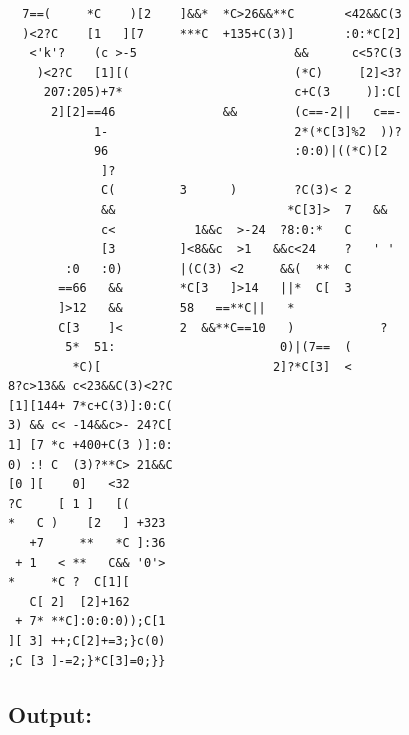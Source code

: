 \documentclass[11pt]{article}
\begin{document}
\begin{lstlisting}
  7==(     *C    )[2    ]&&*  *C>26&&**C       <42&&C(3
  )<2?C    [1   ][7     ***C  +135+C(3)]       :0:*C[2]
   <'k'?    (c >-5                      &&      c<5?C(3
    )<2?C   [1][(                       (*C)     [2]<3?
     207:205)+7*                        c+C(3     )]:C[
      2][2]==46               &&        (c==-2||   c==-
            1-                          2*(*C[3]%2  ))?
            96                          :0:0)|((*C)[2
             ]?
             C(         3      )        ?C(3)< 2
             &&                        *C[3]>  7   &&
             c<           1&&c  >-24  ?8:0:*   C
             [3         ]<8&&c  >1   &&c<24    ?   ' '
        :0   :0)        |(C(3) <2     &&(  **  C
       ==66   &&        *C[3   ]>14   ||*  C[  3
       ]>12   &&        58   ==**C||   *
       C[3    ]<        2  &&**C==10   )            ?
        5*  51:                       0)|(7==  (
         *C)[                        2]?*C[3]  <
8?c>13&& c<23&&C(3)<2?C
[1][144+ 7*c+C(3)]:0:C(
3) && c< -14&&c>- 24?C[
1] [7 *c +400+C(3 )]:0:
0) :! C  (3)?**C> 21&&C
[0 ][    0]   <32
?C     [ 1 ]   [(
*   C )    [2   ] +323
   +7     **   *C ]:36
 + 1   < **   C&& '0'>
*     *C ?  C[1][
   C[ 2]  [2]+162
 + 7* **C]:0:0:0));C[1
][ 3] ++;C[2]+=3;}c(0)
;C [3 ]-=2;}*C[3]=0;}}

\end{lstlisting}

\pagebreak

\subsection*{Output:}
\end{document}
